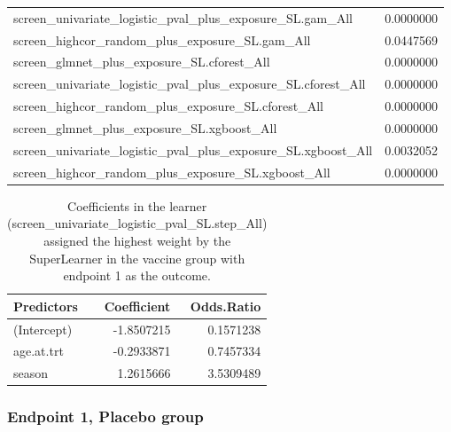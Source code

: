 \documentclass[11pt]{article}
\begin{document}
\begin{table}[!h]
\begin{tabular}[t]{lr}
screen\_univariate\_logistic\_pval\_plus\_exposure\_SL.gam\_All & 0.0000000\\
screen\_highcor\_random\_plus\_exposure\_SL.gam\_All & 0.0447569\\
screen\_glmnet\_plus\_exposure\_SL.cforest\_All & 0.0000000\\
screen\_univariate\_logistic\_pval\_plus\_exposure\_SL.cforest\_All & 0.0000000\\
screen\_highcor\_random\_plus\_exposure\_SL.cforest\_All & 0.0000000\\
screen\_glmnet\_plus\_exposure\_SL.xgboost\_All & 0.0000000\\
screen\_univariate\_logistic\_pval\_plus\_exposure\_SL.xgboost\_All & 0.0032052\\
screen\_highcor\_random\_plus\_exposure\_SL.xgboost\_All & 0.0000000\\
\bottomrule
\end{tabular}
\end{table}

\begin{table}[!h]

\caption{\label{tab:y1vacc8varsetPCAlogd14overd0learner}Coefficients in the learner (screen\_univariate\_logistic\_pval\_SL.step\_All) assigned the highest weight by the SuperLearner in the vaccine group with endpoint 1 as the outcome.}
\centering
\fontsize{10}{12}\selectfont
\begin{tabular}[t]{lrr}
\toprule
Predictors & Coefficient & Odds.Ratio\\
\midrule
(Intercept) & -1.8507215 & 0.1571238\\
age.at.trt & -0.2933871 & 0.7457334\\
season & 1.2615666 & 3.5309489\\
\bottomrule
\end{tabular}
\end{table}

\clearpage

\hypertarget{endpoint-1-placebo-group}{%
\subsubsection{Endpoint 1, Placebo group}\label{endpoint-1-placebo-group}}
\end{document}
